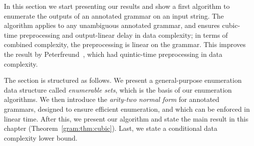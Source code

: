%
%

In this section we start presenting our results and show a first
algorithm to enumerate the outputs of an annotated grammar on an input string.
%
%
%
The algorithm applies to any unambiguous annotated grammar, and ensures cubic-time preprocessing and
output-linear delay in data complexity; in terms of combined complexity, the
preprocessing is linear on the grammar.
%
%
This improves the result by
Peterfreund~\cite{Peterfreund21}, which had quintic-time preprocessing in data complexity.
%
%
%

%
%
%
%
%
%
%
%

The section is structured as follows.
We present a general-purpose enumeration data structure called
\emph{enumerable sets}, which is the basis of 
our enumeration algorithms. 
We then introduce the \emph{arity-two normal form} for annotated grammars,
designed to ensure efficient enumeration, and which can be
enforced in linear time.
After this, we present
our algorithm and state the main result in this chapter (Theorem~\ref{gram:thm:cubic}).
Last, we state a conditional
data complexity lower bound.
%
%
%
%
%
%

